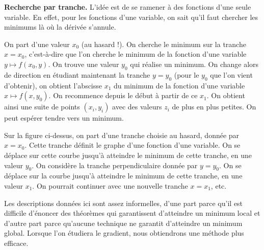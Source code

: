 \documentclass[11pt,class=report,crop=false]{standalone}
\begin{document}
\bigskip

\textbf{Recherche par tranche.} 
L'idée est de se ramener à des fonctions d'une seule variable. En effet, 
pour les fonctions d'une variable, on sait qu'il faut chercher les minimums là où la dérivée s'annule.

On part d'une valeur $x_0$ (au hasard !). On cherche le minimum sur la tranche $x=x_0$, c'est-à-dire que l'on cherche le minimum de la fonction d'une variable $y \mapsto f(x_0,y)$. On trouve une valeur $y_0$ qui réalise un minimum. On change alors de direction en étudiant maintenant la tranche $y=y_0$ (pour le $y_0$ que l'on vient d'obtenir), on obtient l'abscisse $x_1$ du minimum de la fonction d'une variable $x \mapsto f(x,y_0)$. On recommence depuis le début à partir de ce $x_1$. On obtient ainsi une suite de points $(x_i,y_i)$ avec des valeurs $z_i$ de plus en plus petites. On peut espérer tendre vers un minimum. %


   
Sur la figure ci-dessus, on part d'une tranche choisie au hasard, donnée par $x=x_0$. Cette tranche définit le graphe d'une fonction d'une variable. On se déplace sur cette courbe jusqu'à atteindre le minimum de cette tranche, en une valeur $y_0$. On considère la tranche perpendiculaire donnée par $y=y_0$. On se déplace sur la courbe jusqu'à atteindre le minimum de cette tranche, en une valeur $x_1$. On pourrait continuer avec une nouvelle tranche $x=x_1$, etc.

\bigskip

Les descriptions données ici sont assez informelles, d'une part parce qu'il est difficile d'énoncer des théorèmes qui garantissent d'atteindre un minimum local et d'autre part parce qu'aucune technique ne garantit d'atteindre un minimum global. Lorsque l'on étudiera le gradient, nous obtiendrons une méthode plus efficace.
\end{document}
